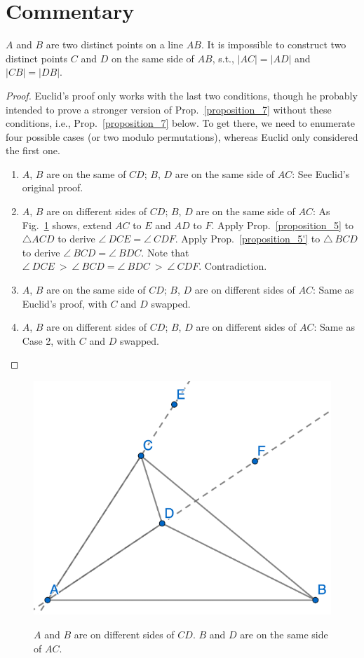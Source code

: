 \section*{Commentary}

\begin{proposition}\label{proposition_7}\leanok
    $A$ and $B$ are two distinct points on a line $AB$. It is impossible to construct two distinct points $C$ and $D$ on the same side of $AB$, s.t., $|AC| = |AD|$ and $|CB| = |DB|$.
\end{proposition}
\begin{proof}
    \leanok
    Euclid's proof only works with the last two conditions, though he probably intended to prove a stronger version of Prop.~\ref{proposition_7} without these conditions, i.e., Prop.~\ref{proposition_7} below.
    To get there, we need to enumerate four possible cases (or two modulo permutations), whereas Euclid only considered the first one. 
    \begin{enumerate}
        \item[] $A$, $B$ are on the same of $CD$; $B$, $D$ are on the same side of $AC$: See Euclid's original proof.
        \item[] $A$, $B$ are on different sides of $CD$; $B$, $D$ are on the same side of $AC$: As Fig.~\ref{fig:prop_7'} shows, extend $AC$ to $E$ and $AD$ to $F$. Apply Prop.~\ref{proposition_5} to $\triangle ACD$ to derive $\angle~DCE = \angle~CDF$. Apply Prop.~\ref{proposition_5'} to $\triangle~BCD$ to derive $\angle~BCD = \angle~BDC$. Note that $\angle~DCE~>~\angle~BCD = \angle~BDC~>~\angle~CDF$. Contradiction. 
        \item[] $A$, $B$ are on the same side of $CD$; $B$, $D$ are on different sides of $AC$: Same as Euclid's proof, with $C$ and $D$ swapped.
        \item[] $A$, $B$ are on different sides of $CD$; $B$, $D$ are on different sides of $AC$: Same as Case 2, with $C$ and $D$ swapped.
    \end{enumerate}
\end{proof}


\begin{figure}[ht]
    \begin{center}
    \includegraphics[width=0.5\linewidth]{figures/proposition_7'.png}
    \label{fig:prop_7'}
    \caption{$A$ and $B$ are on different sides of $CD$. $B$ and $D$ are on the same side of $AC$.}
    \end{center}
\end{figure}


